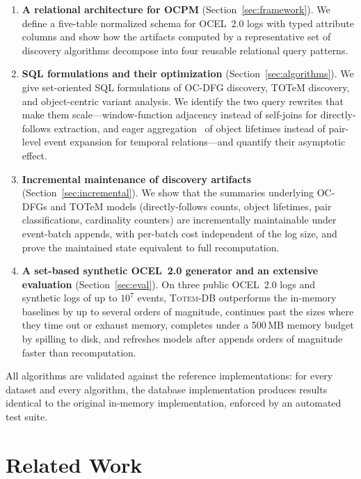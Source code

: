 \documentclass[sigconf, nonacm]{acmart}
\newcommand{\sys}{\textsc{Totem-DB}\xspace}
\newcommand{\ocel}{OCEL~2.0\xspace}
\begin{document}
\begin{enumerate}
\item \textbf{A relational architecture for OCPM} (Section~\ref{sec:framework}). We define a five-table normalized schema for \ocel logs with typed attribute columns and show how the artifacts computed by a representative set of discovery algorithms decompose into four reusable relational query patterns.
\item \textbf{SQL formulations and their optimization} (Section~\ref{sec:algorithms}). We give set-oriented SQL formulations of OC-DFG discovery, TOTeM discovery, and object-centric variant analysis. We identify the two query rewrites that make them scale---window-function adjacency instead of self-joins for directly-follows extraction, and eager aggregation~\cite{yan1995eager} of object lifetimes instead of pair-level event expansion for temporal relations---and quantify their asymptotic effect.
\item \textbf{Incremental maintenance of discovery artifacts} (Section~\ref{sec:incremental}). We show that the summaries underlying OC-DFGs and TOTeM models (directly-follows counts, object lifetimes, pair classifications, cardinality counters) are incrementally maintainable under event-batch appends, with per-batch cost independent of the log size, and prove the maintained state equivalent to full recomputation.
\item \textbf{A set-based synthetic \ocel generator and an extensive evaluation} (Section~\ref{sec:eval}). On three public \ocel logs and synthetic logs of up to $10^7$ events, \sys outperforms the in-memory baselines by up to several orders of magnitude, continues past the sizes where they time out or exhaust memory, completes under a 500\,MB memory budget by spilling to disk, and refreshes models after appends orders of magnitude faster than recomputation.
\end{enumerate}

All algorithms are validated against the reference implementations: for every dataset and every algorithm, the database implementation produces results identical to the original in-memory implementation, enforced by an automated test suite.

\section{Related Work}
\label{sec:related}
\end{document}
